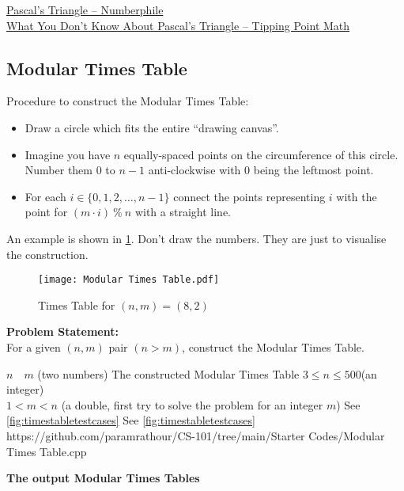 \begin{funvideo}
\href{https://youtu.be/0iMtlus-afo}{Pascal's Triangle -- Numberphile}\\
\href{https://youtu.be/J0I1NuxUcpQ}{What You Don't Know About Pascal's Triangle -- Tipping Point Math}
\end{funvideo}
\recalctypearea
\subsection{Modular Times Table}{\label{pp:timestable}}
Procedure to construct the Modular Times Table:
\begin{itemize}
	\item Draw a circle which fits the entire ``drawing canvas''.
	\item Imagine you have $n$ equally-spaced points on the circumference of this circle. Number them $0$ to $n-1$ anti-clockwise with $0$ being the leftmost point.
	\item For each $i \in \{0,1,2,\ldots,n-1\}$ connect the points representing $i$ with the point for $(m\cdot i)\ \%\ n$ with a straight line.
\end{itemize} An example is shown in \ref{fig:timestable}. Don't draw the numbers. They are just to visualise the construction.
\begin{figure}[H]
	\centering
	\texttt{[image: Modular Times Table.pdf]}
	\caption{Times Table for $(n,m)=(8,2)$}
	\label{fig:timestable}
\end{figure}
\textbf{Problem Statement:}\\
For a given $(n,m)$ pair $(n>m)$, construct the Modular Times Table.
\begin{testcases}
	{$n\quad m$ \hfill(two numbers)}
	{The constructed Modular Times Table}
	{$3 \leq n \leq 500$\hfill(an integer)\\
	$1 < m < n$ \hfill(a double, first try to solve the problem for an integer $m$)}
	{See \ref{fig:timestabletestcases}}
	{See \ref{fig:timestabletestcases}}
	{https://github.com/paramrathour/CS-101/tree/main/Starter Codes/Modular Times Table.cpp}
\end{testcases}
\textbf{The output Modular Times Tables}
